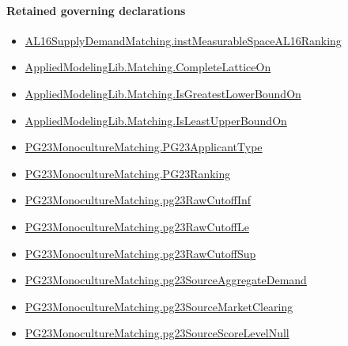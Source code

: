 \documentclass[10pt]{article}
\begin{document}
\paragraph{Retained governing declarations}
\begin{itemize}\raggedright
\item \hyperlink{governing-declaration-45aa1aca7604d942}{AL16\allowbreak{}Supply\allowbreak{}Demand\allowbreak{}Matching.\allowbreak{}inst\allowbreak{}Measurable\allowbreak{}Space\allowbreak{}AL16\allowbreak{}Ranking}
\item \hyperlink{governing-declaration-5a6435b374c654f8}{Applied\allowbreak{}Modeling\allowbreak{}Lib.\allowbreak{}Matching.\allowbreak{}Complete\allowbreak{}Lattice\allowbreak{}On}
\item \hyperlink{governing-declaration-13c8021563ee0830}{Applied\allowbreak{}Modeling\allowbreak{}Lib.\allowbreak{}Matching.\allowbreak{}Is\allowbreak{}Greatest\allowbreak{}Lower\allowbreak{}Bound\allowbreak{}On}
\item \hyperlink{governing-declaration-fe83f0201cd5cc23}{Applied\allowbreak{}Modeling\allowbreak{}Lib.\allowbreak{}Matching.\allowbreak{}Is\allowbreak{}Least\allowbreak{}Upper\allowbreak{}Bound\allowbreak{}On}
\item \hyperlink{paper-prerequisite-40ad59c353cf95ec}{PG23\allowbreak{}Monoculture\allowbreak{}Matching.\allowbreak{}PG23\allowbreak{}Applicant\allowbreak{}Type}
\item \hyperlink{paper-prerequisite-8769258a80216d15}{PG23\allowbreak{}Monoculture\allowbreak{}Matching.\allowbreak{}PG23\allowbreak{}Ranking}
\item \hyperlink{paper-prerequisite-39d91b9ceeab6598}{PG23\allowbreak{}Monoculture\allowbreak{}Matching.\allowbreak{}pg23\allowbreak{}Raw\allowbreak{}Cutoff\allowbreak{}Inf}
\item \hyperlink{paper-prerequisite-9c6e6dc2f90cbb07}{PG23\allowbreak{}Monoculture\allowbreak{}Matching.\allowbreak{}pg23\allowbreak{}Raw\allowbreak{}Cutoff\allowbreak{}Le}
\item \hyperlink{paper-prerequisite-7050c951708d3ed6}{PG23\allowbreak{}Monoculture\allowbreak{}Matching.\allowbreak{}pg23\allowbreak{}Raw\allowbreak{}Cutoff\allowbreak{}Sup}
\item \hyperlink{paper-prerequisite-3fb2e1ac28891e7d}{PG23\allowbreak{}Monoculture\allowbreak{}Matching.\allowbreak{}pg23\allowbreak{}Source\allowbreak{}Aggregate\allowbreak{}Demand}
\item \hyperlink{paper-prerequisite-55bbf5d44984bdf1}{PG23\allowbreak{}Monoculture\allowbreak{}Matching.\allowbreak{}pg23\allowbreak{}Source\allowbreak{}Market\allowbreak{}Clearing}
\item \hyperlink{paper-prerequisite-26aa95cb7c69a47b}{PG23\allowbreak{}Monoculture\allowbreak{}Matching.\allowbreak{}pg23\allowbreak{}Source\allowbreak{}Score\allowbreak{}Level\allowbreak{}Null}
\end{itemize}
\end{document}

